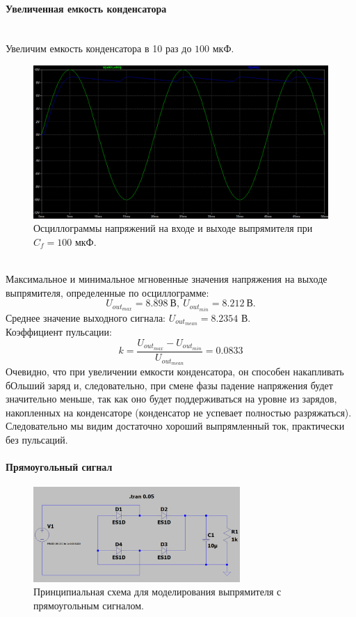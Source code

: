 \documentclass[12pt]{article}
\begin{document}
\paragraph*{Увеличенная емкость конденсатора}
\ \\
Увеличим емкость конденсатора в 10 раз до $100$ мкФ.
\begin{figure}[H]
    \centering
    \includegraphics[width=\textwidth]{4_inc_capacity.png}
    \caption{Осциллограммы напряжений на входе и выходе выпрямителя при $C_f = 100$ мкФ.}
    \label{fig:4_inc_capacity.png}
\end{figure}\\
Максимальное и минимальное мгновенные значения напряжения на выходе выпрямителя, определенные по осциллограмме:
\[
U_{out_{max}} = 8.898 \ \text{В} , \ U_{out_{min}} = 8.212 \ \text{В}.
\]
Среднее значение выходного сигнала: $U_{{out}_{mean}} = 8.2354$ В.\\
Коэффициент пульсации:
\[
k = \frac{U_{out_{max}} - U_{out_{min}}}{U_{{out}_{mean}}} = 0.0833
\]
Очевидно, что при увеличении емкости конденсатора, он способен накапливать бОльший заряд и, следовательно, при смене фазы падение напряжения будет значительно меньше, так как оно будет поддерживаться на уровне из зарядов, накопленных на конденсаторе (конденсатор не успевает полностью разряжаться).\\
Следовательно мы видим достаточно хороший выпрямленный ток, практически без пульсаций.

\paragraph*{Прямоугольный сигнал}

\begin{figure}[H]
    \centering
    \includegraphics[width=0.7\textwidth]{4_rect_signal.png}
    \caption{Принципиальная схема для моделирования выпрямителя с прямоугольным сигналом.}
    \label{fig:4_rect_signal.png}
\end{figure}\\
\end{document}
